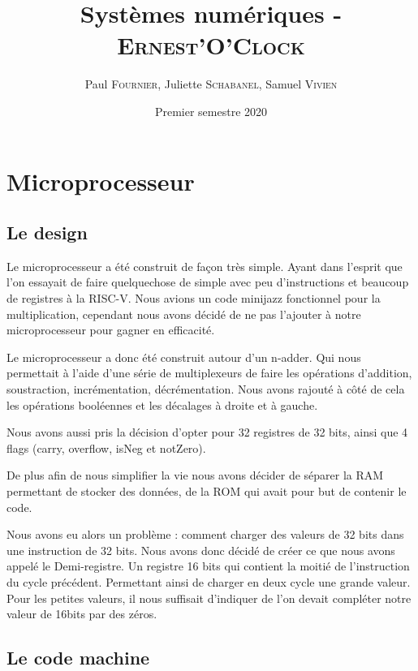\documentclass[10pt,a4paper,notitlepage ]{report}
\title{Systèmes numériques - \textsc{Ernest'O'Clock}}
\date{Premier semestre 2020}
\author{Paul \textsc{Fournier}, Juliette \textsc{Schabanel}, Samuel \textsc{Vivien}}
\begin{document}
	\maketitle
	\pagebreak
	\tableofcontents
	\pagebreak
	
	\section{Microprocesseur}

		\subsection{Le design}

		Le microprocesseur a été construit de façon très simple. Ayant dans l'esprit que l'on essayait de faire quelquechose de simple avec peu d'instructions et beaucoup de registres à la RISC-V. Nous avions un code minijazz fonctionnel pour la multiplication, cependant nous avons décidé de ne pas l'ajouter à notre microprocesseur pour gagner en efficacité.

		Le microprocesseur a donc été construit autour d'un n-adder. Qui nous permettait à l'aide d'une série de multiplexeurs de faire les opérations d'addition, soustraction, incrémentation, décrémentation. Nous avons rajouté à côté de cela les opérations booléennes et les décalages à droite et à gauche.

		Nous avons aussi pris la décision d'opter pour 32 registres de 32 bits, ainsi que 4 flags (carry, overflow, isNeg et notZero).

		De plus afin de nous simplifier la vie nous avons décider de séparer la RAM permettant de stocker des données, de la ROM qui avait pour but de contenir le code.

		Nous avons eu alors un problème : comment charger des valeurs de 32 bits dans une instruction de 32 bits. Nous avons donc décidé de créer ce que nous avons appelé le Demi-registre. Un registre 16 bits qui contient la moitié de l'instruction du cycle précédent. Permettant ainsi de charger en deux cycle une grande valeur. Pour les petites valeurs, il nous suffisait d'indiquer de l'on devait compléter notre valeur de 16bits par des zéros.

		\subsection{Le code machine}
\end{document}
